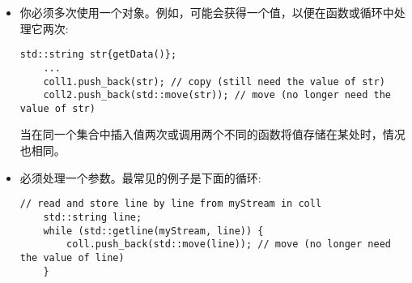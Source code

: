 \begin{itemize}
	\item 你必须多次使用一个对象。例如，可能会获得一个值，以便在函数或循环中处理它两次:\par
	\begin{lstlisting}[caption={}]
	std::string str{getData()};
	...
	coll1.push_back(str); // copy (still need the value of str)
	coll2.push_back(std::move(str)); // move (no longer need the value of str)
	\end{lstlisting}
	当在同一个集合中插入值两次或调用两个不同的函数将值存储在某处时，情况也相同。
	\item 必须处理一个参数。最常见的例子是下面的循环:\par
	\begin{lstlisting}[caption={}]
	// read and store line by line from myStream in coll
	std::string line;
	while (std::getline(myStream, line)) {
		coll.push_back(std::move(line)); // move (no longer need the value of line)
	}
	\end{lstlisting}
\end{itemize}








